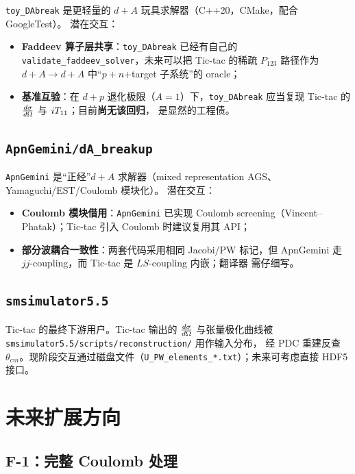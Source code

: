 \texttt{toy\_DAbreak} 是更轻量的 \(d+A\) 玩具求解器（C++20，CMake，配合 GoogleTest）。
潜在交互：
\begin{itemize}
  \item \textbf{Faddeev 算子层共享}：\texttt{toy\_DAbreak} 已经有自己的 \texttt{validate\_faddeev\_solver}，未来可以把 Tic-tac 的稀疏 \(P_{123}\) 路径作为
        \(d+A\to d+A\) 中“\(p+n\)+target 子系统”的 oracle；
  \item \textbf{基准互验}：在 \(d+p\) 退化极限（\(A=1\)）下，\texttt{toy\_DAbreak} 应当复现 Tic-tac 的 \(\frac{d\sigma}{d\Omega}\) 与 \({i T_{11}}\)；目前\textbf{尚无该回归}，
        是显然的工程债。
\end{itemize}

\subsection{\texttt{ApnGemini/dA\_breakup}}

\texttt{ApnGemini} 是“正经”\(d+A\) 求解器（mixed representation AGS、Yamaguchi/EST/Coulomb 模块化）。
潜在交互：
\begin{itemize}
  \item \textbf{Coulomb 模块借用}：\texttt{ApnGemini} 已实现 Coulomb screening（Vincent--Phatak）；Tic-tac 引入 Coulomb 时建议复用其 API；
  \item \textbf{部分波耦合一致性}：两套代码采用相同 Jacobi/PW 标记，但 ApnGemini 走 \(jj\)-coupling，而 Tic-tac 是 \(LS\)-coupling 内嵌；翻译器
        需仔细写。
\end{itemize}

\subsection{\texttt{smsimulator5.5}}

Tic-tac 的最终下游用户。Tic-tac 输出的 \(\frac{d\sigma}{d\Omega}\) 与张量极化曲线被 \texttt{smsimulator5.5/scripts/reconstruction/} 用作输入分布，
经 PDC 重建反查 \(\theta_{cm}\)。现阶段交互通过磁盘文件（\texttt{U\_PW\_elements\_*.txt}）；未来可考虑直接 HDF5 接口。

\section{未来扩展方向}
\label{sec:appF_future}

\subsection{F-1：完整 Coulomb 处理}
\label{subsec:appF_future_coulomb}

